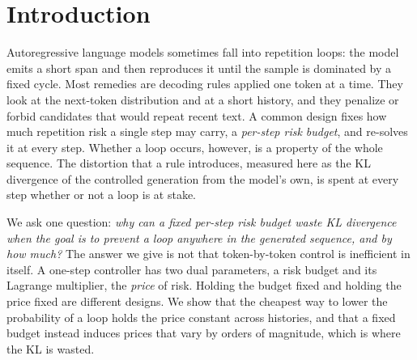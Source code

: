 \documentclass[make,article,submit,pdftex]{Definitions/mdpi}
\begin{document}
\section{Introduction}\label{sec:intro}

Autoregressive language models sometimes fall into repetition loops: the model emits a short span and then reproduces it until the sample is dominated by a fixed cycle. Most remedies are decoding rules applied one token at a time. They look at the next-token distribution and at a short history, and they penalize or forbid candidates that would repeat recent text. A common design fixes how much repetition risk a single step may carry, a \emph{per-step risk budget}, and re-solves it at every step. Whether a loop occurs, however, is a property of the whole sequence. The distortion that a rule introduces, measured here as the KL divergence of the controlled generation from the model's own, is spent at every step whether or not a loop is at stake.

We ask one question: \emph{why can a fixed per-step risk budget waste KL divergence when the goal is to prevent a loop anywhere in the generated sequence, and by how much?} The answer we give is not that token-by-token control is inefficient in itself. A one-step controller has two dual parameters, a risk budget and its Lagrange multiplier, the \emph{price} of risk. Holding the budget fixed and holding the price fixed are different designs. We show that the cheapest way to lower the probability of a loop holds the price constant across histories, and that a fixed budget instead induces prices that vary by orders of magnitude, which is where the KL is wasted.
\end{document}
